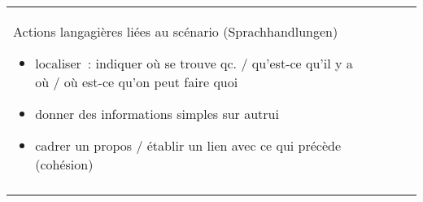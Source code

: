 \documentclass[output=paper]{langscibook}
\begin{document}
\begin{otherlanguage}{french}
\begin{table}
\begin{tabularx}{\textwidth}{|l|l|l|X|}
		   
		   Actions langagières liées au scénario (Sprachhandlungen)
		   \begin{itemize}[noitemsep,nosep,after=\vspace*{-\baselineskip}]
		   	\item localiser : indiquer où se trouve qc. / qu’est-ce qu’il y a où  / où est-ce qu’on peut faire quoi
		   \item donner des informations simples sur autrui
		   \item cadrer un propos / établir un lien avec ce qui précède (cohésion)
		   \end{itemize}\\\hhline{----}
	\end{tabularx}

\end{table}
\end{otherlanguage}
\end{document}

